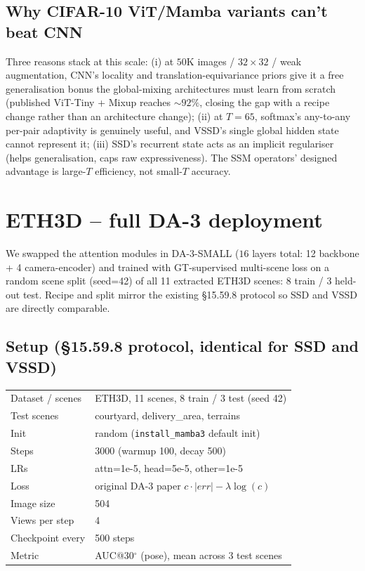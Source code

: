 \documentclass[11pt,a4paper]{article}
\begin{document}
\subsection{Why CIFAR-10 ViT/Mamba variants can't beat CNN}

Three reasons stack at this scale: (i) at $50$K images / $32\times 32$
/ weak augmentation, CNN's locality and translation-equivariance
priors give it a free generalisation bonus the global-mixing
architectures must learn from scratch (published ViT-Tiny + Mixup
reaches $\sim 92\%$, closing the gap with a recipe change rather than
an architecture change); (ii) at $T=65$, softmax's any-to-any
per-pair adaptivity is genuinely useful, and VSSD's single global
hidden state cannot represent it; (iii) SSD's recurrent state acts as
an implicit regulariser (helps generalisation, caps raw expressiveness).
The SSM operators' designed advantage is large-$T$ efficiency, not
small-$T$ accuracy.

\section{ETH3D -- full DA-3 deployment}
\label{sec:eth3d}

We swapped the attention modules in DA-3-SMALL ($16$ layers total: 12
backbone + 4 camera-encoder) and trained with GT-supervised
multi-scene loss on a random scene split (seed=42) of all 11 extracted
ETH3D scenes: 8 train / 3 held-out test. Recipe and split mirror the
existing \S15.59.8 protocol so SSD and VSSD are directly comparable.

\subsection{Setup (\S15.59.8 protocol, identical for SSD and VSSD)}

\begin{center}
\begin{tabular}{ll}
\toprule
Dataset / scenes      & ETH3D, 11 scenes, 8 train / 3 test (seed 42) \\
Test scenes           & courtyard, delivery\_area, terrains \\
Init                  & random (\texttt{install\_mamba3} default init) \\
Steps                 & 3000 (warmup 100, decay 500) \\
LRs                   & attn=1e-5, head=5e-5, other=1e-5 \\
Loss                  & original DA-3 paper $c\cdot|err| - \lambda\log(c)$ \\
Image size            & 504 \\
Views per step        & 4 \\
Checkpoint every      & 500 steps \\
Metric                & AUC@30$^\circ$ (pose), mean across 3 test scenes \\
\bottomrule
\end{tabular}
\end{center}
\end{document}
